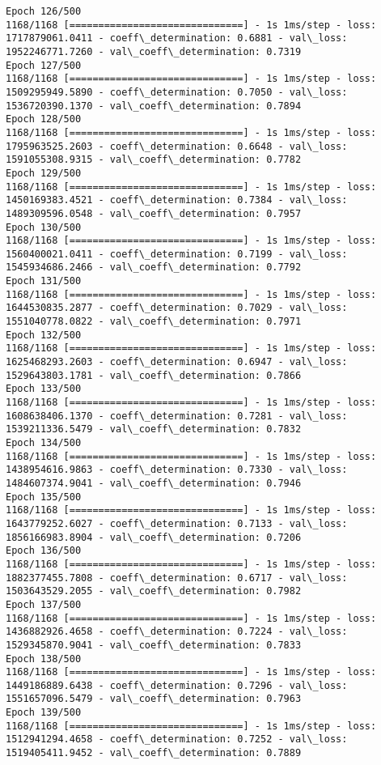 \documentclass[11pt]{article}
\begin{document}
\begin{Verbatim}[commandchars=\\\{\}]
Epoch 126/500
1168/1168 [==============================] - 1s 1ms/step - loss: 1717879061.0411 - coeff\_determination: 0.6881 - val\_loss: 1952246771.7260 - val\_coeff\_determination: 0.7319
Epoch 127/500
1168/1168 [==============================] - 1s 1ms/step - loss: 1509295949.5890 - coeff\_determination: 0.7050 - val\_loss: 1536720390.1370 - val\_coeff\_determination: 0.7894
Epoch 128/500
1168/1168 [==============================] - 1s 1ms/step - loss: 1795963525.2603 - coeff\_determination: 0.6648 - val\_loss: 1591055308.9315 - val\_coeff\_determination: 0.7782
Epoch 129/500
1168/1168 [==============================] - 1s 1ms/step - loss: 1450169383.4521 - coeff\_determination: 0.7384 - val\_loss: 1489309596.0548 - val\_coeff\_determination: 0.7957
Epoch 130/500
1168/1168 [==============================] - 1s 1ms/step - loss: 1560400021.0411 - coeff\_determination: 0.7199 - val\_loss: 1545934686.2466 - val\_coeff\_determination: 0.7792
Epoch 131/500
1168/1168 [==============================] - 1s 1ms/step - loss: 1644530835.2877 - coeff\_determination: 0.7029 - val\_loss: 1551040778.0822 - val\_coeff\_determination: 0.7971
Epoch 132/500
1168/1168 [==============================] - 1s 1ms/step - loss: 1625468293.2603 - coeff\_determination: 0.6947 - val\_loss: 1529643803.1781 - val\_coeff\_determination: 0.7866
Epoch 133/500
1168/1168 [==============================] - 1s 1ms/step - loss: 1608638406.1370 - coeff\_determination: 0.7281 - val\_loss: 1539211336.5479 - val\_coeff\_determination: 0.7832
Epoch 134/500
1168/1168 [==============================] - 1s 1ms/step - loss: 1438954616.9863 - coeff\_determination: 0.7330 - val\_loss: 1484607374.9041 - val\_coeff\_determination: 0.7946
Epoch 135/500
1168/1168 [==============================] - 1s 1ms/step - loss: 1643779252.6027 - coeff\_determination: 0.7133 - val\_loss: 1856166983.8904 - val\_coeff\_determination: 0.7206
Epoch 136/500
1168/1168 [==============================] - 1s 1ms/step - loss: 1882377455.7808 - coeff\_determination: 0.6717 - val\_loss: 1503643529.2055 - val\_coeff\_determination: 0.7982
Epoch 137/500
1168/1168 [==============================] - 1s 1ms/step - loss: 1436882926.4658 - coeff\_determination: 0.7224 - val\_loss: 1529345870.9041 - val\_coeff\_determination: 0.7833
Epoch 138/500
1168/1168 [==============================] - 1s 1ms/step - loss: 1449186889.6438 - coeff\_determination: 0.7296 - val\_loss: 1551657096.5479 - val\_coeff\_determination: 0.7963
Epoch 139/500
1168/1168 [==============================] - 1s 1ms/step - loss: 1512941294.4658 - coeff\_determination: 0.7252 - val\_loss: 1519405411.9452 - val\_coeff\_determination: 0.7889

\end{Verbatim}
\end{document}
